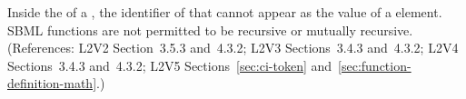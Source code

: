 Inside the  of a \FunctionDefinition, the identifier of that
\FunctionDefinition cannot appear as the value of a  element.  SBML
functions are not permitted to be recursive or mutually recursive.
(References: L2V2 Section~3.5.3 and~4.3.2; L2V3 Sections~3.4.3 and~4.3.2;
L2V4 Sections~3.4.3 and~4.3.2; L2V5 Sections~\ref{sec:ci-token}
and~\ref{sec:function-definition-math}.)
